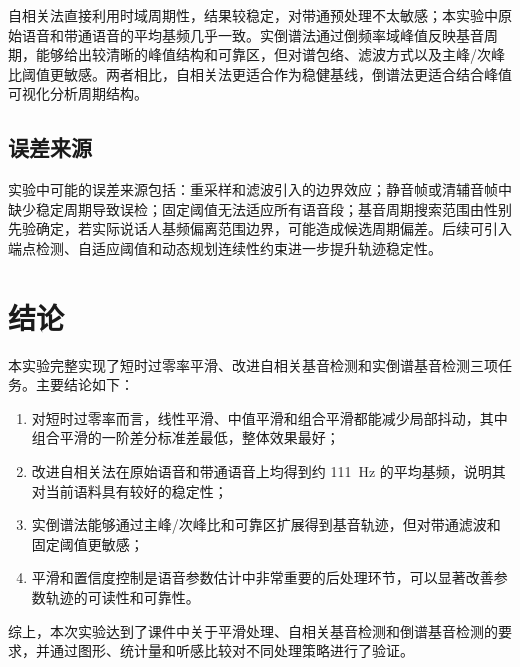 \documentclass[UTF8,a4paper,12pt,fontset=fandol]{ctexart}
\begin{document}
自相关法直接利用时域周期性，结果较稳定，对带通预处理不太敏感；本实验中原始语音和带通语音的平均基频几乎一致。实倒谱法通过倒频率域峰值反映基音周期，能够给出较清晰的峰值结构和可靠区，但对谱包络、滤波方式以及主峰/次峰比阈值更敏感。两者相比，自相关法更适合作为稳健基线，倒谱法更适合结合峰值可视化分析周期结构。

\subsection{误差来源}

实验中可能的误差来源包括：重采样和滤波引入的边界效应；静音帧或清辅音帧中缺少稳定周期导致误检；固定阈值无法适应所有语音段；基音周期搜索范围由性别先验确定，若实际说话人基频偏离范围边界，可能造成候选周期偏差。后续可引入端点检测、自适应阈值和动态规划连续性约束进一步提升轨迹稳定性。

\section{结论}

本实验完整实现了短时过零率平滑、改进自相关基音检测和实倒谱基音检测三项任务。主要结论如下：
\begin{enumerate}[label=(\arabic*)]
    \item 对短时过零率而言，线性平滑、中值平滑和组合平滑都能减少局部抖动，其中组合平滑的一阶差分标准差最低，整体效果最好；
    \item 改进自相关法在原始语音和带通语音上均得到约 \SI{111}{Hz} 的平均基频，说明其对当前语料具有较好的稳定性；
    \item 实倒谱法能够通过主峰/次峰比和可靠区扩展得到基音轨迹，但对带通滤波和固定阈值更敏感；
    \item 平滑和置信度控制是语音参数估计中非常重要的后处理环节，可以显著改善参数轨迹的可读性和可靠性。
\end{enumerate}

综上，本次实验达到了课件中关于平滑处理、自相关基音检测和倒谱基音检测的要求，并通过图形、统计量和听感比较对不同处理策略进行了验证。
\end{document}
